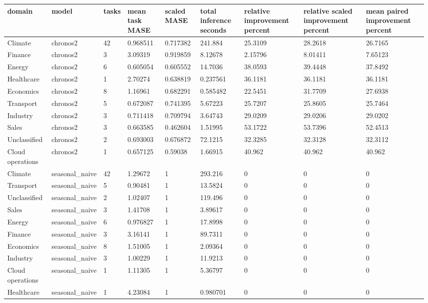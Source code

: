 \begin{tabular}{lllllllll}
\toprule
domain & model & tasks & mean task MASE & scaled MASE & total inference seconds & relative improvement percent & relative scaled improvement percent & mean paired improvement percent \\
\midrule
Climate & chronos2 & 42 & 0.968511 & 0.717382 & 241.884 & 25.3109 & 28.2618 & 26.7165 \\
Finance & chronos2 & 3 & 3.09319 & 0.919859 & 8.12678 & 2.15796 & 8.01411 & 7.65123 \\
Energy & chronos2 & 6 & 0.605054 & 0.605552 & 14.7036 & 38.0593 & 39.4448 & 37.8492 \\
Healthcare & chronos2 & 1 & 2.70274 & 0.638819 & 0.237561 & 36.1181 & 36.1181 & 36.1181 \\
Economics & chronos2 & 8 & 1.16961 & 0.682291 & 0.585482 & 22.5451 & 31.7709 & 27.6938 \\
Transport & chronos2 & 5 & 0.672087 & 0.741395 & 5.67223 & 25.7207 & 25.8605 & 25.7464 \\
Industry & chronos2 & 3 & 0.711418 & 0.709794 & 3.64743 & 29.0209 & 29.0206 & 29.0202 \\
Sales & chronos2 & 3 & 0.663585 & 0.462604 & 1.51995 & 53.1722 & 53.7396 & 52.4513 \\
Unclassified & chronos2 & 2 & 0.693003 & 0.676872 & 72.1215 & 32.3285 & 32.3128 & 32.3112 \\
Cloud operations & chronos2 & 1 & 0.657125 & 0.59038 & 1.66915 & 40.962 & 40.962 & 40.962 \\
Climate & seasonal\_naive & 42 & 1.29672 & 1 & 293.216 & 0 & 0 & 0 \\
Transport & seasonal\_naive & 5 & 0.90481 & 1 & 13.5824 & 0 & 0 & 0 \\
Unclassified & seasonal\_naive & 2 & 1.02407 & 1 & 119.496 & 0 & 0 & 0 \\
Sales & seasonal\_naive & 3 & 1.41708 & 1 & 3.89617 & 0 & 0 & 0 \\
Energy & seasonal\_naive & 6 & 0.976827 & 1 & 17.8998 & 0 & 0 & 0 \\
Finance & seasonal\_naive & 3 & 3.16141 & 1 & 89.7311 & 0 & 0 & 0 \\
Economics & seasonal\_naive & 8 & 1.51005 & 1 & 2.09364 & 0 & 0 & 0 \\
Industry & seasonal\_naive & 3 & 1.00229 & 1 & 11.9213 & 0 & 0 & 0 \\
Cloud operations & seasonal\_naive & 1 & 1.11305 & 1 & 5.36797 & 0 & 0 & 0 \\
Healthcare & seasonal\_naive & 1 & 4.23084 & 1 & 0.980701 & 0 & 0 & 0 \\
\bottomrule
\end{tabular}
